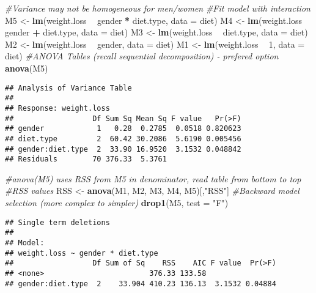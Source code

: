 \documentclass[]{book}
\newenvironment{Shaded}{\begin{snugshade}}{\end{snugshade}}
\newcommand{\CommentTok}[1]{\textcolor[rgb]{0.56,0.35,0.01}{\textit{#1}}}
\newcommand{\DataTypeTok}[1]{\textcolor[rgb]{0.13,0.29,0.53}{#1}}
\newcommand{\DecValTok}[1]{\textcolor[rgb]{0.00,0.00,0.81}{#1}}
\newcommand{\KeywordTok}[1]{\textcolor[rgb]{0.13,0.29,0.53}{\textbf{#1}}}
\newcommand{\NormalTok}[1]{#1}
\newcommand{\OperatorTok}[1]{\textcolor[rgb]{0.81,0.36,0.00}{\textbf{#1}}}
\newcommand{\StringTok}[1]{\textcolor[rgb]{0.31,0.60,0.02}{#1}}
\theoremstyle{definition}
\theoremstyle{definition}
\theoremstyle{definition}
\theoremstyle{remark}
\begin{document}
\begin{Shaded}
\begin{Highlighting}[]
\CommentTok{#Variance may not be homogeneous for men/women }
\CommentTok{#Fit model with interaction}
\NormalTok{M5 <-}\StringTok{ }\KeywordTok{lm}\NormalTok{(weight.loss }\OperatorTok{~}\StringTok{ }\NormalTok{gender }\OperatorTok{*}\StringTok{ }\NormalTok{diet.type, }\DataTypeTok{data =}\NormalTok{ diet)}
\NormalTok{M4 <-}\StringTok{ }\KeywordTok{lm}\NormalTok{(weight.loss }\OperatorTok{~}\StringTok{ }\NormalTok{gender }\OperatorTok{+}\StringTok{ }\NormalTok{diet.type, }\DataTypeTok{data =}\NormalTok{ diet)}
\NormalTok{M3 <-}\StringTok{ }\KeywordTok{lm}\NormalTok{(weight.loss }\OperatorTok{~}\StringTok{ }\NormalTok{diet.type, }\DataTypeTok{data =}\NormalTok{ diet)}
\NormalTok{M2 <-}\StringTok{ }\KeywordTok{lm}\NormalTok{(weight.loss }\OperatorTok{~}\StringTok{ }\NormalTok{gender, }\DataTypeTok{data =}\NormalTok{ diet)}
\NormalTok{M1 <-}\StringTok{ }\KeywordTok{lm}\NormalTok{(weight.loss }\OperatorTok{~}\StringTok{ }\DecValTok{1}\NormalTok{, }\DataTypeTok{data =}\NormalTok{ diet)}
\CommentTok{#ANOVA Tables (recall sequential decomposition) - prefered option}
\KeywordTok{anova}\NormalTok{(M5)}
\end{Highlighting}
\end{Shaded}

\begin{verbatim}
## Analysis of Variance Table
## 
## Response: weight.loss
##                  Df Sum Sq Mean Sq F value   Pr(>F)
## gender            1   0.28  0.2785  0.0518 0.820623
## diet.type         2  60.42 30.2086  5.6190 0.005456
## gender:diet.type  2  33.90 16.9520  3.1532 0.048842
## Residuals        70 376.33  5.3761
\end{verbatim}

\begin{Shaded}
\begin{Highlighting}[]
\CommentTok{#anova(M5) uses RSS from M5 in denominator, read table from bottom to top}
\CommentTok{#RSS values}
\NormalTok{RSS <-}\StringTok{ }\KeywordTok{anova}\NormalTok{(M1, M2, M3, M4, M5)[,}\StringTok{"RSS"}\NormalTok{]}
\CommentTok{#Backward model selection (more complex to simpler)}
\KeywordTok{drop1}\NormalTok{(M5, }\DataTypeTok{test =} \StringTok{"F"}\NormalTok{)}
\end{Highlighting}
\end{Shaded}

\begin{verbatim}
## Single term deletions
## 
## Model:
## weight.loss ~ gender * diet.type
##                  Df Sum of Sq    RSS    AIC F value  Pr(>F)
## <none>                        376.33 133.58                
## gender:diet.type  2    33.904 410.23 136.13  3.1532 0.04884
\end{verbatim}
\end{document}
